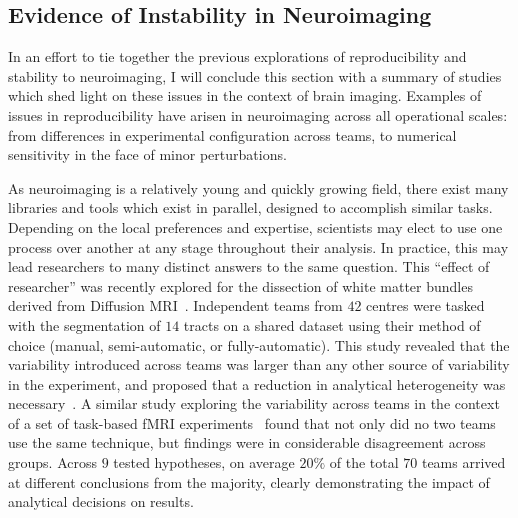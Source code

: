 \subsection{Evidence of Instability in Neuroimaging}
In an effort to tie together the previous explorations of reproducibility and stability to neuroimaging, I will
conclude this section with a summary of studies which shed light on these issues in the context of brain imaging.
Examples of issues in reproducibility have arisen in neuroimaging across all operational scales: from differences in
experimental configuration across teams, to numerical sensitivity in the face of minor perturbations.

As neuroimaging is a relatively young and quickly growing field, there exist many libraries and tools which exist in
parallel, designed to accomplish similar tasks. Depending on the local preferences and expertise, scientists may elect
to use one process over another at any stage throughout their analysis. In practice, this may lead researchers to many
distinct answers to the same question. This ``effect of researcher'' was recently explored for the dissection of white
matter bundles derived from Diffusion MRI~\cite{schilling2020tractography}. Independent teams from $42$ centres were
tasked with the segmentation of $14$ tracts on a shared dataset using their method of choice (manual, semi-automatic,
or fully-automatic). This study revealed that the variability introduced across teams was larger than any other source
of variability in the experiment, and proposed that a reduction in analytical heterogeneity was
necessary~\cite{schilling2020tractography}. A similar study exploring the variability across teams in the context of a
set of task-based fMRI experiments~\cite{botvinik2020variability} found that not only did no two teams use the same
technique, but findings were in considerable disagreement across groups. Across $9$ tested hypotheses, on average
$20\%$ of the total $70$ teams arrived at different conclusions from the majority, clearly demonstrating the impact of
analytical decisions on results.

